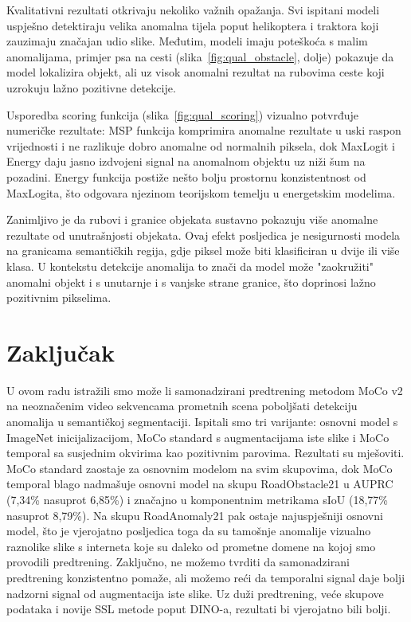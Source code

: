 \documentclass[diplomskirad]{fer}
\begin{document}
Kvalitativni rezultati otkrivaju nekoliko važnih opažanja. Svi
ispitani modeli uspješno detektiraju velika anomalna tijela poput
helikoptera i traktora koji zauzimaju značajan udio slike. Međutim,
modeli imaju poteškoća s malim anomalijama, primjer psa na cesti
(slika~\ref{fig:qual_obstacle}, dolje) pokazuje da model lokalizira
objekt, ali uz visok anomalni rezultat na rubovima ceste koji
uzrokuju lažno pozitivne detekcije.

Usporedba scoring funkcija (slika~\ref{fig:qual_scoring}) vizualno
potvrđuje numeričke rezultate: MSP funkcija komprimira anomalne
rezultate u uski raspon vrijednosti i ne razlikuje dobro anomalne
od normalnih piksela, dok MaxLogit i Energy daju jasno izdvojeni
signal na anomalnom objektu uz niži šum na pozadini. Energy funkcija
postiže nešto bolju prostornu konzistentnost od MaxLogita, što
odgovara njezinom teorijskom temelju u energetskim modelima.

Zanimljivo je da rubovi i granice objekata sustavno pokazuju više
anomalne rezultate od unutrašnjosti objekata. Ovaj efekt posljedica
je nesigurnosti modela na granicama semantičkih regija, gdje piksel
može biti klasificiran u dvije ili više klasa. U kontekstu detekcije
anomalija to znači da model može "zaokružiti" anomalni objekt i s
unutarnje i s vanjske strane granice, što doprinosi lažno pozitivnim
pikselima.



\chapter{Zaključak}
\label{pog:zakljucak}

U ovom radu istražili smo može li samonadzirani predtrening metodom MoCo v2 na neoznačenim video sekvencama prometnih scena poboljšati detekciju anomalija u semantičkoj segmentaciji. Ispitali smo tri varijante: osnovni model s ImageNet inicijalizacijom, MoCo standard s augmentacijama iste slike i MoCo temporal sa susjednim okvirima kao pozitivnim parovima. Rezultati su mješoviti. MoCo standard zaostaje za osnovnim modelom na svim skupovima, dok MoCo temporal blago nadmašuje osnovni model na skupu RoadObstacle21 u AUPRC (7,34\% nasuprot 6,85\%) i značajno u komponentnim metrikama sIoU (18,77\% nasuprot 8,79\%). Na skupu RoadAnomaly21 pak ostaje najuspješniji osnovni model, što je vjerojatno posljedica toga da su tamošnje anomalije vizualno raznolike slike s interneta koje su daleko od prometne domene na kojoj smo provodili predtrening. Zaključno, ne možemo tvrditi da samonadzirani predtrening konzistentno pomaže, ali možemo reći da temporalni signal daje bolji nadzorni signal od augmentacija iste slike. Uz duži predtrening, veće skupove podataka i novije SSL metode poput DINO-a, rezultati bi vjerojatno bili bolji.
\end{document}
